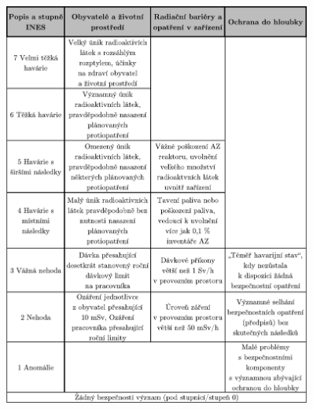 \begin{figure}[h!]
    \centering
    \includegraphics[width=0.9\textwidth]{img/INES_tab.pdf}
\end{figure}